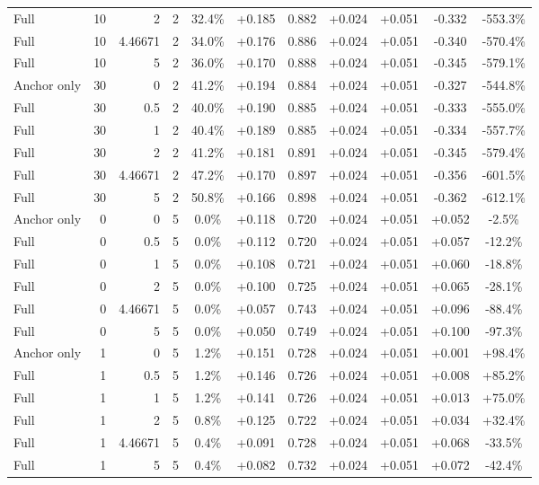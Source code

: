 \begin{table}[htbp]
\begin{tabular}{lrrrccccccc}
Full & 10 & 2 & 2 & 32.4\% & +0.185 & 0.882 & +0.024 & +0.051 & -0.332 & -553.3\% \\
Full & 10 & 4.46671 & 2 & 34.0\% & +0.176 & 0.886 & +0.024 & +0.051 & -0.340 & -570.4\% \\
Full & 10 & 5 & 2 & 36.0\% & +0.170 & 0.888 & +0.024 & +0.051 & -0.345 & -579.1\% \\
Anchor only & 30 & 0 & 2 & 41.2\% & +0.194 & 0.884 & +0.024 & +0.051 & -0.327 & -544.8\% \\
Full & 30 & 0.5 & 2 & 40.0\% & +0.190 & 0.885 & +0.024 & +0.051 & -0.333 & -555.0\% \\
Full & 30 & 1 & 2 & 40.4\% & +0.189 & 0.885 & +0.024 & +0.051 & -0.334 & -557.7\% \\
Full & 30 & 2 & 2 & 41.2\% & +0.181 & 0.891 & +0.024 & +0.051 & -0.345 & -579.4\% \\
Full & 30 & 4.46671 & 2 & 47.2\% & +0.170 & 0.897 & +0.024 & +0.051 & -0.356 & -601.5\% \\
Full & 30 & 5 & 2 & 50.8\% & +0.166 & 0.898 & +0.024 & +0.051 & -0.362 & -612.1\% \\
Anchor only & 0 & 0 & 5 & 0.0\% & +0.118 & 0.720 & +0.024 & +0.051 & +0.052 & -2.5\% \\
Full & 0 & 0.5 & 5 & 0.0\% & +0.112 & 0.720 & +0.024 & +0.051 & +0.057 & -12.2\% \\
Full & 0 & 1 & 5 & 0.0\% & +0.108 & 0.721 & +0.024 & +0.051 & +0.060 & -18.8\% \\
Full & 0 & 2 & 5 & 0.0\% & +0.100 & 0.725 & +0.024 & +0.051 & +0.065 & -28.1\% \\
Full & 0 & 4.46671 & 5 & 0.0\% & +0.057 & 0.743 & +0.024 & +0.051 & +0.096 & -88.4\% \\
Full & 0 & 5 & 5 & 0.0\% & +0.050 & 0.749 & +0.024 & +0.051 & +0.100 & -97.3\% \\
Anchor only & 1 & 0 & 5 & 1.2\% & +0.151 & 0.728 & +0.024 & +0.051 & +0.001 & +98.4\% \\
Full & 1 & 0.5 & 5 & 1.2\% & +0.146 & 0.726 & +0.024 & +0.051 & +0.008 & +85.2\% \\
Full & 1 & 1 & 5 & 1.2\% & +0.141 & 0.726 & +0.024 & +0.051 & +0.013 & +75.0\% \\
Full & 1 & 2 & 5 & 0.8\% & +0.125 & 0.722 & +0.024 & +0.051 & +0.034 & +32.4\% \\
Full & 1 & 4.46671 & 5 & 0.4\% & +0.091 & 0.728 & +0.024 & +0.051 & +0.068 & -33.5\% \\
Full & 1 & 5 & 5 & 0.4\% & +0.082 & 0.732 & +0.024 & +0.051 & +0.072 & -42.4\% \\

\end{tabular}
\end{table}

